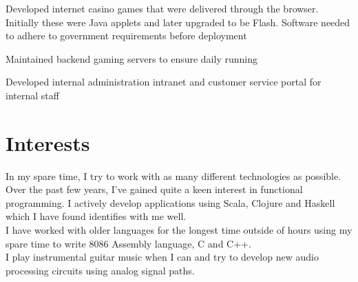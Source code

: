 \documentclass[letterpaper]{deedy-resume} %
\begin{document}
\begin{minipage}[t]{0.66\textwidth}
\sectionspace %



\begin{tightitemize}
\item Developed internet casino games that were delivered through the browser. Initially these were Java applets and later upgraded to be Flash. Software needed to adhere to government requirements before deployment
\item Maintained backend gaming servers to ensure daily running
\item Developed internal administration intranet and customer service portal for internal staff
\end{tightitemize}

\sectionspace %

\section{Interests}

In my spare time, I try to work with as many different technologies as possible. Over the past few years, I've gained quite a keen interest in functional programming. I actively develop applications using Scala, Clojure and Haskell which I have found identifies with me well. \\
I have worked with older languages for the longest time outside of hours using my spare time to write 8086 Assembly language, C and C++.\\
I play instrumental guitar music when I can and try to develop new audio processing circuits using analog signal paths.

\end{minipage} %




\end{document}
